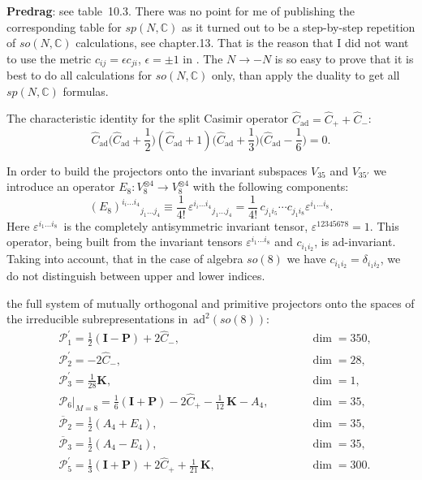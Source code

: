 \begin{description}
{\bf Predrag}: see  {table~10.3}. There was no
point for me of publishing the corresponding table for $sp(N,\mathbb{C})$
as it turned out to be a step-by-step repetition of $so(N,\mathbb{C})$
calculations, see  {chapter.13}. That is the
reason that I did not want to use the metric $c_{ij}=\epsilon c_{ji}$,
$\epsilon=\pm1$ in . The $N\to -N$ is so easy to prove
that it is best to do all calculations for $so(N,\mathbb{C})$ only, than
apply the duality to get all $sp(N,\mathbb{C})$ formulas.

The characteristic identity for the split Casimir operator
$\widehat{C}_{\mathrm{ad}}=\widehat{C}_+ + \widehat{C}_-$:
\begin{equation}
\label{eq4.39}
\widehat{C}_{\mathrm{ad}}\biggl(\widehat{C}_{\mathrm{ad}}+\frac{1}{2}\biggr) (\widehat{C}_{\mathrm{ad}}+1)
\biggl(\widehat{C}_{\mathrm{ad}}+\frac{1}{3}\biggr)\biggl(\widehat{C}_{\mathrm{ad}}-\frac{1}{6}\biggr)=0 .
\end{equation}

In order to build the projectors onto the invariant subspaces $V_{35}$ and $V_{35'}$
we introduce an operator $E_8\colon V_{8}^{\otimes 4}\to V_{8}^{\otimes 4}$ with the following components:
\begin{equation}
(E_8)^{i_i\dots i_4}{}_{j_1\dots j_4}
 \equiv \frac{1}{4!}\,\varepsilon^{i_i\dots i_4}{}_{j_1\dots j_4}=\frac{1}{4!}\,
 c_{j_1i_5} \cdots c_{j_1i_8}\varepsilon^{i_1\dots i_8}.
\end{equation}
Here $\varepsilon^{i_1\dots i_8}$~is the completely antisymmetric invariant tensor, $\varepsilon^{12345678}=1$. This operator, being built from the invariant tensors $\varepsilon^{i_1\dots i_8}$ and $c_{i_1i_2}$, is $\mathrm{ad}$-invariant. Taking into account, that in the case of algebra $so(8)$ we have $c_{i_1i_2}=\delta_{i_1i_2}$, we do not distinguish between upper and lower indices.

the full system of mutually orthogonal and primitive projectors onto the spaces of the irreducible subrepresentations in~$\mathrm{ad}^2(so(8))$:
\begin{equation}
\begin{alignedat}{2}
&\mathcal{P}_1^\prime=\frac{1}{2}(\mathbf{I}-\mathbf{P})+2\widehat{C}_-, &\qquad &\dim=350,\\
&\mathcal{P}_2^\prime=-2\widehat{C}_-, &\qquad &\dim=28,\\
&\mathcal{P}_3^\prime=\frac{1}{28}\mathbf{K}, &\qquad &\dim=1,\\[1mm]
&\mathcal{P}_6|^{}_{M=8}=\frac{1}{6}(\mathbf{I}+\mathbf{P})-2\widehat{C}_+-\frac{1}{12}\,\mathbf{K}-A_4,
&\qquad &\dim=35,\\[1mm]
&\mathcal{\overline{P}}_2=\frac{1}{2}(A_4+E_4), &\qquad &\dim=35,\\[1mm]
&\mathcal{\overline{P}}_3=\frac{1}{2}(A_4-E_4), &\qquad &\dim=35,\\[1mm]
&\mathcal{P}_5^\prime=\frac{1}{3}(\mathbf{I}+\mathbf{P})+2\widehat{C}_++\frac{1}{21}\,\mathbf{K}, &\qquad &\dim=300.
\end{alignedat}
\end{equation}


\end{description}
